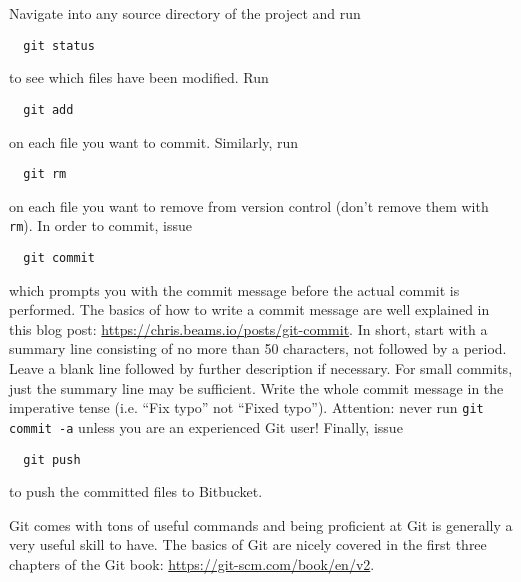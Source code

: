 \documentclass{article}
\begin{document}
Navigate into any source directory of the project and run
\begin{lstlisting}
  git status
\end{lstlisting}
to see which files have been modified. Run
\begin{lstlisting}
  git add
\end{lstlisting}
on each file you want to commit. Similarly, run
\begin{lstlisting}
  git rm
\end{lstlisting}
on each file you want to remove from version control (don’t remove them with \lstinline!rm!). In order to commit, issue
\begin{lstlisting}
  git commit
\end{lstlisting}
which prompts you with the commit message before the actual commit is performed. The basics of how to write a commit message are well explained in this blog post: \url{https://chris.beams.io/posts/git-commit}. In short, start with a summary line consisting of no more than 50 characters, not followed by a period. Leave a blank line followed by further description if necessary. For small commits, just the summary line may be sufficient. Write the whole commit message in the imperative tense (i.e. ``Fix typo'' not ``Fixed typo''). Attention: never run \lstinline!git commit -a! unless you are an experienced Git user! Finally, issue
\begin{lstlisting}
  git push
\end{lstlisting}
to push the committed files to Bitbucket.

Git comes with tons of useful commands and being proficient at Git is generally a very useful skill to have. The basics of Git are nicely covered in the first three chapters of the Git book: \url{https://git-scm.com/book/en/v2}.
\end{document}
